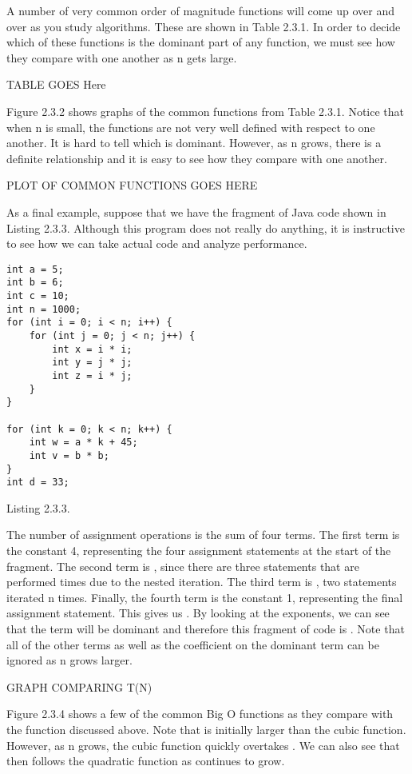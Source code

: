 A number of very common order of magnitude functions will come up over and over as you study algorithms. These are shown in Table 2.3.1. In order to decide which of these functions is the dominant part of any
function, we must see how they compare with one another as n gets large.

TABLE GOES Here


Figure 2.3.2 shows graphs of the common functions from Table 2.3.1. Notice that when n is small, the functions are not very well defined with respect to one another. It is hard to tell which is dominant. However, as n grows, there is a definite relationship and it is easy to see how they compare with one another.

PLOT OF COMMON FUNCTIONS GOES HERE

As a final example, suppose that we have the fragment of Java code shown in Listing 2.3.3. Although this program does not really do anything, it is instructive to see how we can take actual code and analyze performance.
\begin{verbatim}
int a = 5;
int b = 6;
int c = 10;
int n = 1000;
for (int i = 0; i < n; i++) {
	for (int j = 0; j < n; j++) {
		int x = i * i;
		int y = j * j;
		int z = i * j;
	}
}

for (int k = 0; k < n; k++) {
	int w = a * k + 45;
	int v = b * b;
}
int d = 33;
\end{verbatim}
Listing 2.3.3.


The number of assignment operations is the sum of four terms. The first term is the constant 4, representing the four assignment statements at the start of the fragment. The second term is ,
since there are three statements that are performed times due to the nested iteration. The third term is , two statements iterated n times. Finally, the fourth term is the constant 1, representing the final assignment statement. This gives us . By looking at the exponents, we can see that the term will be dominant and therefore this fragment of code is . Note that all of the other terms as well as the coefficient on the dominant term can be ignored as n grows larger.


GRAPH COMPARING T(N)

Figure 2.3.4 shows a few of the common Big O functions as they compare with the function discussed above. Note that is initially larger than the cubic function. However, as n grows, the cubic function quickly overtakes . We can also see that then follows the quadratic function as continues to grow.

